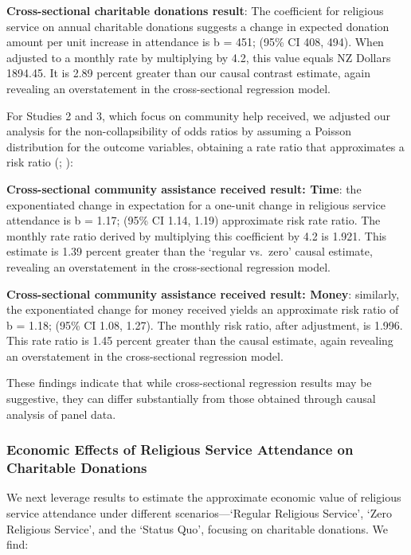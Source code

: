 \documentclass[
  single column]{article}
\begin{document}
\textbf{Cross-sectional charitable donations result}: The coefficient
for religious service on annual charitable donations suggests a change
in expected donation amount per unit increase in attendance is b = 451;
(95\% CI 408, 494). When adjusted to a monthly rate by multiplying by
4.2, this value equals NZ Dollars 1894.45. It is 2.89 percent greater
than our causal contrast estimate, again revealing an overstatement in
the cross-sectional regression model.

For Studies 2 and 3, which focus on community help received, we adjusted
our analysis for the non-collapsibility of odds ratios by assuming a
Poisson distribution for the outcome variables, obtaining a rate ratio
that approximates a risk ratio
(; ):

\textbf{Cross-sectional community assistance received result: Time}: the
exponentiated change in expectation for a one-unit change in religious
service attendance is b = 1.17; (95\% CI 1.14, 1.19) approximate risk
rate ratio. The monthly rate ratio derived by multiplying this
coefficient by 4.2 is 1.921. This estimate is 1.39 percent greater than
the `regular vs.~zero' causal estimate, revealing an overstatement in
the cross-sectional regression model.

\textbf{Cross-sectional community assistance received result: Money}:
similarly, the exponentiated change for money received yields an
approximate risk ratio of b = 1.18; (95\% CI 1.08, 1.27). The monthly
risk ratio, after adjustment, is 1.996. This rate ratio is 1.45 percent
greater than the causal estimate, again revealing an overstatement in
the cross-sectional regression model.

These findings indicate that while cross-sectional regression results
may be suggestive, they can differ substantially from those obtained
through causal analysis of panel data.

\newpage{}

\subsubsection{Economic Effects of Religious Service Attendance on
Charitable
Donations}\label{economic-effects-of-religious-service-attendance-on-charitable-donations}

We next leverage results to estimate the approximate economic value of
religious service attendance under different scenarios---`Regular
Religious Service', `Zero Religious Service', and the `Status Quo',
focusing on charitable donations. We find:
\end{document}
